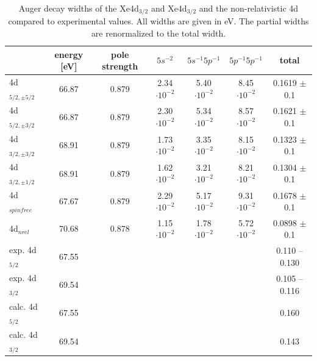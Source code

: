 \begin{table}[h]
 \centering
 \footnotesize
 \caption{Auger decay widths of the Xe4d$_{3/2}$ and Xe4d$_{3/2}$
          and the non-relativistic
          4d compared to experimental values\cite{Ausmees99}.
          All widths are given in \unit{eV}.
          The partial widths are renormalized to the total width.}
 \begin{tabular}{lcccccc}
   \toprule
               & energy [\unit{eV}] & pole strength & $5s^{-2}$          & $5s^{-1}5p^{-1}$   & $5p^{-1}5p^{-1}$   & total \\
   \midrule                                                                                     
     4d$_{5/2,\pm 5/2}$ &  66.87    &   0.879       & 2.34$\cdot10^{-2}$ & 5.40$\cdot10^{-2}$ & 8.45$\cdot10^{-2}$ & 0.1619 $\pm$ 0.1\\
     4d$_{5/2,\pm 3/2}$ &  66.87    &   0.879       & 2.30$\cdot10^{-2}$ & 5.34$\cdot10^{-2}$ & 8.57$\cdot10^{-2}$ & 0.1621 $\pm$ 0.1\\
     4d$_{3/2,\pm 3/2}$ &  68.91    &   0.879       & 1.73$\cdot10^{-2}$ & 3.35$\cdot10^{-2}$ & 8.15$\cdot10^{-2}$ & 0.1323 $\pm$ 0.1\\
     4d$_{3/2,\pm 1/2}$ &  68.91    &   0.879       & 1.62$\cdot10^{-2}$ & 3.21$\cdot10^{-2}$ & 8.21$\cdot10^{-2}$ & 0.1304 $\pm$ 0.1\\
     4d$_{spinfree}$    &  67.67    &   0.879       & 2.29$\cdot10^{-2}$ & 5.17$\cdot10^{-2}$ & 9.31$\cdot10^{-2}$ & 0.1678 $\pm$ 0.1\\
     4d$_{nrel}$        &  70.68    &   0.878       & 1.15$\cdot10^{-2}$ & 1.78$\cdot10^{-2}$ & 5.72$\cdot10^{-2}$ & 0.0898 $\pm$ 0.1\\
     \midrule
     exp. 4d$_{5/2}$    &  67.55 \cite{King77}   &      &       &   &    & 0.110 -- 0.130 \cite{Ausmees99} \\
     exp. 4d$_{3/2}$    &  69.54 \cite{King77}   &      &       &   &    & 0.105 -- 0.116 \cite{Ausmees99} \\
     calc. 4d$_{5/2}$ \cite{Maentykenttae93} &67.55&    &       &   &    & 0.160  \\
     calc. 4d$_{3/2}$ \cite{Maentykenttae93} &69.54&    &       &   &    & 0.143  \\
   \bottomrule                                                                                 
 \end{tabular}                                                                                 
 \label{table:xe_auger_4d_rates}
\end{table}

